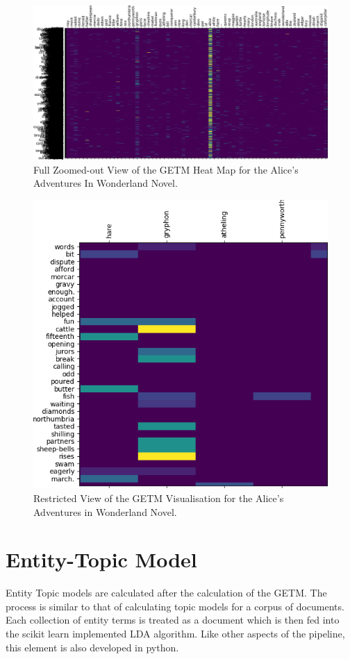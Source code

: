 \documentclass[10pt]{report}
\begin{document}
\begin{figure}[h!]
  \centering
  \includegraphics[scale=0.3]{getm_clutter}
  \caption{Full Zoomed-out View of the GETM Heat Map for the Alice's Adventures In Wonderland Novel.\label{fig:getm_visualisation}}
\end{figure}

\begin{figure}[h!]
  \centering
  \includegraphics[scale=0.4]{getm_reduced}
  \caption{Restricted View of the GETM Visualisation for the Alice's Adventures in Wonderland Novel.\label{fig:getm_vis_reduced}}
\end{figure}

\newpage
\section{Entity-Topic Model}
Entity Topic models are calculated after the calculation of the GETM. The process is similar to that of calculating topic models for a corpus of documents. Each collection of entity terms is treated as a document which is then fed into the scikit learn implemented LDA algorithm. Like other aspects of the pipeline, this element is also developed in python.
\end{document}
